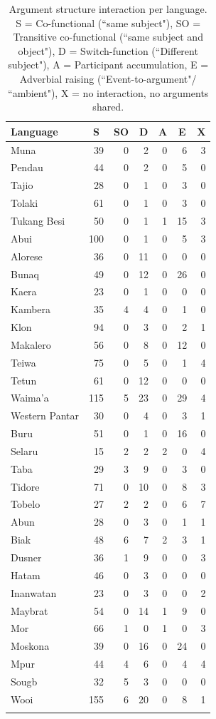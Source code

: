 \begin{table}
\begin{tabular}{lrrrrrr}
  \lsptoprule
Language & \multicolumn{1}{c}{S} & \multicolumn{1}{c}{SO} & \multicolumn{1}{c}{D} & \multicolumn{1}{c}{A} & \multicolumn{1}{c}{E} & \multicolumn{1}{c}{X} \tabularnewline 
  \midrule
  Muna &  39 &   0 &   2 &   0 &   6 &   3 \tabularnewline 
  Pendau &  44 &   0 &   2 &   0 &   5 &   0 \tabularnewline 
  Tajio &  28 &   0 &   1 &   0 &   3 &   0 \tabularnewline 
  Tolaki &  61 &   0 &   1 &   0 &   3 &   0 \tabularnewline 
  Tukang Besi &  50 &   0 &   1 &   1 &  15 &   3 \tabularnewline 
  \midrule
  Abui & 100 &   0 &   1 &   0 &   5 &   3 \tabularnewline 
  Alorese &  36 &   0 &  11 &   0 &   0 &   0 \tabularnewline 
  Bunaq &  49 &   0 &  12 &   0 &  26 &   0 \tabularnewline 
  Kaera &  23 &   0 &   1 &   0 &   0 &   0 \tabularnewline 
  Kambera &  35 &   4 &   4 &   0 &   1 &   0 \tabularnewline 
  Klon &  94 &   0 &   3 &   0 &   2 &   1 \tabularnewline 
  Makalero &  56 &   0 &  8 &   0 &  12 &   0 \tabularnewline 
  Teiwa &  75 &   0 &   5 &   0 &   1 &   4 \tabularnewline 
  Tetun &  61 &   0 &  12 &   0 &   0 &   0 \tabularnewline 
  Waima'a & 115 &   5 &  23 &   0 &  29 &   4 \tabularnewline 
  Western Pantar &  30 &   0 &   4 &   0 &   3 &   1 \tabularnewline 
  \midrule
  Buru & 51 & 0 & 1 & 0 & 16 & 0 \tabularnewline
  Selaru &  15 &   2 &   2 &   2 &   0 &   4 \tabularnewline 
  Taba &  29 &   3 &  9 &   0 &   3 &   0 \tabularnewline 
  Tidore & 71 & 0 & 10 & 0 & 8 & 3 \tabularnewline
  Tobelo &  27 &   2 &   2 &   0 &   6 &  7 \tabularnewline 
  \midrule
  Abun &  28 &   0 &   3 &   0 &   1 &   1 \tabularnewline 
  Biak &  48 &   6 &  7 &   2 &   3 &   1 \tabularnewline 
  Dusner &  36 &   1 &  9 &   0 &   0 &   3 \tabularnewline 
  Hatam &  46 &   0 &  3 &   0 &   0 &   0 \tabularnewline 
  Inanwatan &  23 &   0 &   3 &   0 &   0 &   2 \tabularnewline 
  Maybrat &  54 &   0 &  14 &   1 &  9 &   0 \tabularnewline 
  Mor &  66 &   1 &   0 &   1 &   0 &  3 \tabularnewline 
  Moskona &  39 &   0 &  16 &   0 &  24 &   0 \tabularnewline 
  Mpur &  44 &   4 &   6 &   0 &   4 &   4 \tabularnewline 
  Sougb &  32 &   5 &   3 &   0 &   0 &   0 \tabularnewline 
  Wooi & 155 &   6 &  20 &   0 &   8 &   1 \tabularnewline 
   \lspbottomrule
\end{tabular}
\caption[Argument structure interaction per language]{Argument structure interaction per language. S = Co-functional (``same subject"), SO = Transitive co-functional (``same subject and object"), D = Switch-function (``Different subject"), A = Participant accumulation, E = Adverbial raising (``Event-to-argument"/ ``ambient"), X = no interaction, no arguments shared.}
\label{table:Referentiality_per_lang}
\end{table}

